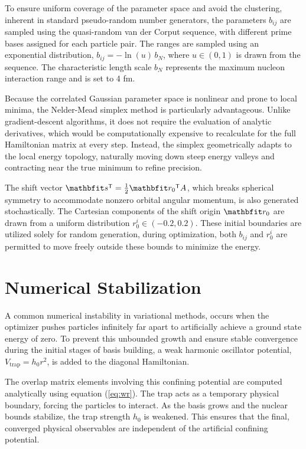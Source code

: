 \documentclass[a4paper,oneside,article,12pt]{memoir}
\begin{document}
To ensure uniform coverage of the parameter space and avoid the clustering, inherent in standard pseudo-random number generators, the parameters $b_{ij}$ are sampled using the quasi-random van der Corput sequence, with different prime bases assigned for each particle pair. The ranges are sampled using an exponential distribution, $b_{ij} = -\ln(u) \, b_N$, where $u \in (0,1)$ is drawn from the sequence. The characteristic length scale $b_N$ represents the maximum nucleon interaction range and is set to 4 fm. 

Because the correlated Gaussian parameter space is nonlinear and prone to local minima, the Nelder-Mead simplex method is particularly advantageous. Unlike gradient-descent algorithms, it does not require the evaluation of analytic derivatives, which would be computationally expensive to recalculate for the full Hamiltonian matrix at every step. Instead, the simplex geometrically adapts to the local energy topology, naturally moving down steep energy valleys and contracting near the true minimum to refine precision.

The shift vector $\v{s}\tr = \frac{1}{2}\v{r}_0\tr A$, which breaks spherical symmetry to accommodate nonzero orbital angular momentum, is also generated stochastically. The Cartesian components of the shift origin $\v{r}_0$ are drawn from a uniform distribution $r_0^i \in (-0.2, 0.2)$. These initial boundaries are utilized solely for random generation, during optimization, both $b_{ij}$ and $r_0^i$ are permitted to move freely outside these bounds to minimize the energy.

\section{Numerical Stabilization}
A common numerical instability in variational methods, occurs when the optimizer pushes particles infinitely far apart to artificially achieve a ground state energy of zero. To prevent this unbounded growth and ensure stable convergence during the initial stages of basis building, a weak harmonic oscillator potential, $V_{\text{trap}} = h_0 r^2$, is added to the diagonal Hamiltonian. 

The overlap matrix elements involving this confining potential are computed analytically using equation (\ref{eq:wr}). The trap acts as a temporary physical boundary, forcing the particles to interact. As the basis grows and the nuclear bounds stabilize, the trap strength $h_0$ is weakened. This ensures that the final, converged physical observables are independent of the artificial confining potential.
\end{document}
